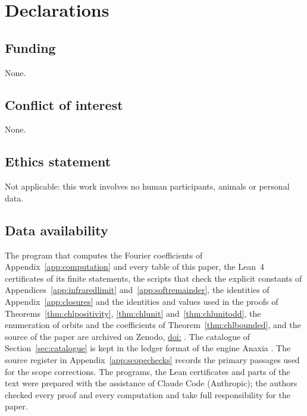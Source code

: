 \section*{Declarations}

\subsection*{Funding} None.

\subsection*{Conflict of interest} None.

\subsection*{Ethics statement} Not applicable: this work involves no human participants, animals or personal data.

\subsection*{Data availability} The program that computes the Fourier coefficients of Appendix~\ref{app:computation} and every table of this paper, the Lean~4 certificates of its finite statements, the scripts that check the explicit constants of Appendices~\ref{app:infraredlimit} and~\ref{app:softremainder}, the identities of Appendix~\ref{app:closures} and the identities and values used in the proofs of Theorems~\ref{thm:chlpositivity}, \ref{thm:chlunit} and~\ref{thm:chlunitodd}, the enumeration of orbits and the coefficients of Theorem~\ref{thm:chlbounded}, and the source of the paper are archived on Zenodo, \href{https://doi.org/\zenodoCodeID}{doi:\zenodoCodeID} \cite{Bha26}. The catalogue of Section~\ref{sec:catalogue} is kept in the ledger format of the engine Anaxia \cite{BLLM26}. The source register in Appendix~\ref{app:scopechecks} records the primary passages used for the scope corrections. The programs, the Lean certificates and parts of the text were prepared with the assistance of Claude Code (Anthropic); the authors checked every proof and every computation and take full responsibility for the paper.
